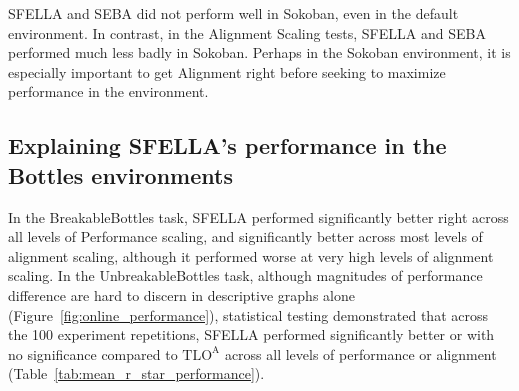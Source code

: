 SFELLA and SEBA did not perform well in Sokoban, even in the default environment. In contrast, in the Alignment Scaling tests, SFELLA and SEBA performed much less badly in Sokoban. Perhaps in the Sokoban environment, it is especially important to get Alignment right before seeking to maximize performance in the environment.

\subsection{Explaining SFELLA's performance in the Bottles environments}


In the BreakableBottles task, SFELLA performed significantly better right across all levels of Performance scaling, and significantly better across most levels of alignment scaling, although it performed worse at very high levels of alignment scaling. In the UnbreakableBottles task, although magnitudes of performance difference are hard to discern in descriptive graphs alone (Figure~\ref{fig:online_performance}), statistical testing demonstrated that across the 100 experiment repetitions, SFELLA performed significantly better or with no significance compared to  $\text{TLO}^\text{A}$ across all levels of performance or alignment (Table~\ref{tab:mean_r_star_performance}).


